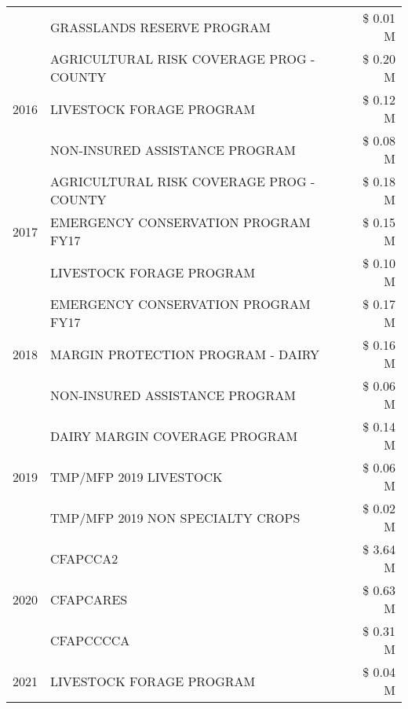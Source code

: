 \begin{tabular}{llr}
 & GRASSLANDS RESERVE PROGRAM & \$ 0.01 M \\
\cline{1-3}
\multirow[t]{3}{*}{2016} & AGRICULTURAL RISK COVERAGE PROG - COUNTY & \$ 0.20 M \\
 & LIVESTOCK FORAGE PROGRAM & \$ 0.12 M \\
 & NON-INSURED ASSISTANCE PROGRAM & \$ 0.08 M \\
\cline{1-3}
\multirow[t]{3}{*}{2017} & AGRICULTURAL RISK COVERAGE PROG - COUNTY & \$ 0.18 M \\
 & EMERGENCY CONSERVATION PROGRAM FY17 & \$ 0.15 M \\
 & LIVESTOCK FORAGE PROGRAM & \$ 0.10 M \\
\cline{1-3}
\multirow[t]{3}{*}{2018} & EMERGENCY CONSERVATION PROGRAM FY17 & \$ 0.17 M \\
 & MARGIN PROTECTION PROGRAM - DAIRY & \$ 0.16 M \\
 & NON-INSURED ASSISTANCE PROGRAM & \$ 0.06 M \\
\cline{1-3}
\multirow[t]{3}{*}{2019} & DAIRY MARGIN COVERAGE PROGRAM & \$ 0.14 M \\
 & TMP/MFP 2019 LIVESTOCK & \$ 0.06 M \\
 & TMP/MFP 2019 NON SPECIALTY CROPS & \$ 0.02 M \\
\cline{1-3}
\multirow[t]{3}{*}{2020} & CFAPCCA2 & \$ 3.64 M \\
 & CFAPCARES & \$ 0.63 M \\
 & CFAPCCCCA & \$ 0.31 M \\
\cline{1-3}
2021 & LIVESTOCK FORAGE PROGRAM & \$ 0.04 M \\
\cline{1-3}
\bottomrule
\end{tabular}
